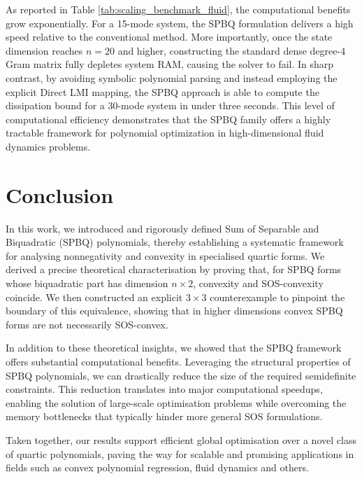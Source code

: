 \documentclass[12pt]{elsarticle}
\theoremstyle{definition}
\begin{document}
As reported in Table \ref{tab:scaling_benchmark_fluid}, the computational benefits grow exponentially. For a 15-mode system, the SPBQ formulation delivers a high speed relative to the conventional method. More importantly, once the state dimension reaches $n=20$ and higher, constructing the standard dense degree-4 Gram matrix fully depletes system RAM, causing the solver to fail. In sharp contrast, by avoiding symbolic polynomial parsing and instead employing the explicit Direct LMI mapping, the SPBQ approach is able to compute the dissipation bound for a 30-mode system in under three seconds. This level of computational efficiency demonstrates that the SPBQ family offers a highly tractable framework for polynomial optimization in high-dimensional fluid dynamics problems.
\section{Conclusion}

In this work, we introduced and rigorously defined Sum of Separable and Biquadratic (SPBQ) polynomials, thereby establishing a systematic framework for analysing nonnegativity and convexity in specialised quartic forms. We derived a precise theoretical characterisation by proving that, for SPBQ forms whose biquadratic part has dimension $n \times 2$, convexity and SOS-convexity coincide. We then constructed an explicit $3 \times 3$ counterexample to pinpoint the boundary of this equivalence, showing that in higher dimensions convex SPBQ forms are not necessarily SOS-convex.

In addition to these theoretical insights, we showed that the SPBQ framework offers substantial computational benefits. Leveraging the structural properties of SPBQ polynomials, we can drastically reduce the size of the required semidefinite constraints. This reduction translates into major computational speedups, enabling the solution of large-scale optimisation problems while overcoming the memory bottlenecks that typically hinder more general SOS formulations.

Taken together, our results support efficient global optimisation over a novel class of quartic polynomials, paving the way for scalable and promising applications in fields such as convex polynomial regression, fluid dynamics and others.

%
%

\end{document}
